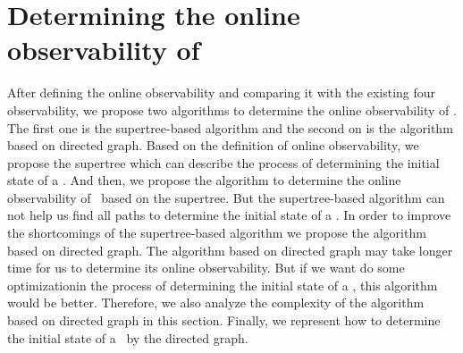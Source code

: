 \section{Determining the online observability of \BCNs}
\label{sec:deter}
After defining the online observability and comparing it with the existing four observability, we propose two algorithms to determine the online observability of \BCNs. The first one is the supertree-based algorithm and the second on is the algorithm based on directed graph. Based on the definition of online observability, we propose the supertree which can describe the process of determining the initial state of a \BCN. And then, we propose the algorithm to determine the online observability of \BCNs\ based on the supertree. But the supertree-based algorithm can not help us find all paths to determine the initial state of a \BCN. In order to improve the shortcomings of the supertree-based algorithm we propose the algorithm based on directed graph. The algorithm based on directed graph may take longer time for us to determine its online observability. But if we want do some optimizationin the process of determining the initial state of a \BCN, this algorithm would be better. Therefore, we also analyze the complexity of the algorithm based on directed graph in this section. Finally, we represent how to determine the initial state of a \BCN\ by the directed graph.

